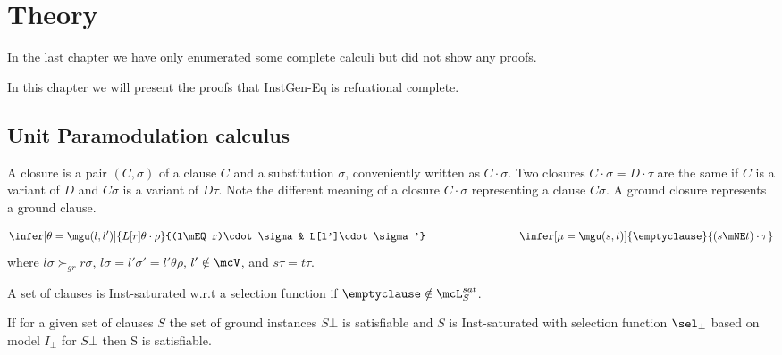 
\chapter{Theory}

In the last chapter we have only enumerated some complete calculi but did not show any proofs.

In this chapter we will present the proofs that InstGen-Eq is refuational complete.


\section{Unit Paramodulation calculus}

\cite{GK2004csl}

\begin{definition}
    A closure is a pair $(C,\sigma)$ of a clause $C$ and a substitution $\sigma$,
    conveniently written as $C\cdot\sigma$. Two closures $C\cdot\sigma = D\cdot\tau$
    are the same if $C$ is a variant of $D$ and $C\sigma$ is a variant of $D\tau$.
    Note the different meaning of a closure $C\cdot\sigma$ representing a clause $C\sigma$.
    A ground closure represents a ground clause.
\end{definition}

\begin{gather*}
        \infer[\theta=\mgu(l,l')]
        {L[r]\theta\cdot\rho}
        {(l\mEQ r)\cdot\sigma & L[l']\cdot\sigma'}
        \hspace{3cm}
        \infer[\mu=\mgu(s,t)]
        {\emptyclause}
        {(s\mNE t)\cdot\tau}
\end{gather*}
where
    $l\sigma\succ_{gr} r\sigma$,
    $l\sigma = l'\sigma' = l'\theta\rho$,
    $l'\notin\mcV$,
    and
    $s\tau = t\tau$.



\begin{definition}
    A set of clauses is Inst-saturated w.r.t a selection function if
    $\emptyclause\notin\mcL_S^{sat}$.
\end{definition}

\begin{theorem}
    If for a given set of clauses $S$
    the set of ground instances $S\bot$ is satisfiable
    and $S$ is Inst-saturated
    with selection function $\sel_\bot$ based
    on model $I_\bot$ for $S\bot$
    then S is satisfiable.
\end{theorem}

